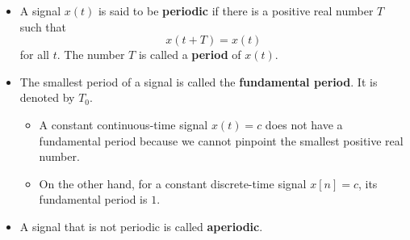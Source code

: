 \documentclass[10pt]{article}
\begin{document}
\begin{itemize}
  \item A signal $x(t)$ is said to be {\bf periodic} if there is a positive real number $T$ such that $$x(t + T) = x(t)$$ for all $t$. The number $T$ is called a {\bf period} of $x(t)$.
  
  \item The smallest period of a signal is called the {\bf fundamental period}. It is denoted by $T_0$.  
  \begin{itemize}
    \item A constant continuous-time signal $x(t) = c$ does not have a fundamental period because we cannot pinpoint the smallest positive real number.
    
    \item On the other hand, for a constant discrete-time signal $x[n] = c$, its fundamental period is $1$.
  \end{itemize}

  \item A signal that is not periodic is called {\bf aperiodic}.
\end{itemize}


  
\end{document}
